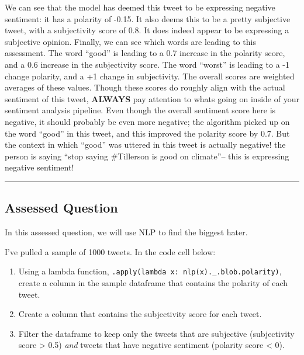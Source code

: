 \documentclass[
  letterpaper,
  DIV=11,
  numbers=noendperiod]{scrreprt}
\providecommand{\tightlist}{%
  \setlength{\itemsep}{0pt}\setlength{\parskip}{0pt}}\usepackage{longtable,booktabs,array}
\begin{document}
We can see that the model has deemed this tweet to be expressing
negative sentiment: it has a polarity of -0.15. It also deems this to be
a pretty subjective tweet, with a subjectivity score of 0.8. It does
indeed appear to be expressing a subjective opinion. Finally, we can see
which words are leading to this assessment. The word ``good'' is leading
to a 0.7 increase in the polarity score, and a 0.6 increase in the
subjectivity score. The word ``worst'' is leading to a -1 change
polarity, and a +1 change in subjectivity. The overall scores are
weighted averages of these values. Though these scores do roughly align
with the actual sentiment of this tweet, \textbf{ALWAYS} pay attention
to whats going on inside of your sentiment analysis pipeline. Even
though the overall sentiment score here is negative, it should probably
be even more negative; the algorithm picked up on the word ``good'' in
this tweet, and this improved the polarity score by 0.7. But the context
in which ``good'' was uttered in this tweet is actually negative! the
person is saying ``stop saying \#Tillerson is good on climate''-- this
is expressing negative sentiment!

\begin{center}\rule{0.5\linewidth}{0.5pt}\end{center}

\hypertarget{assessed-question-3}{%
\subsection{Assessed Question}\label{assessed-question-3}}

In this assessed question, we will use NLP to find the biggest hater.

I've pulled a sample of 1000 tweets. In the code cell below:

\begin{enumerate}
\def\labelenumi{\arabic{enumi}.}
\tightlist
\item
  Using a lambda function,
  \texttt{.apply(lambda\ x:\ nlp(x).\_.blob.polarity)}, create a column
  in the sample dataframe that contains the polarity of each tweet.
\item
  Create a column that contains the subjectivity score for each tweet.
\item
  Filter the dataframe to keep only the tweets that are subjective
  (subjectivity score \textgreater{} 0.5) \emph{and} tweets that have
  negative sentiment (polarity score \textless{} 0).
\end{enumerate}
\end{document}
